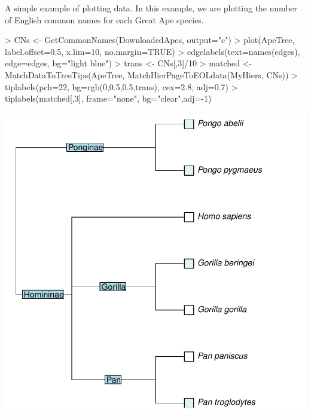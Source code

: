 \documentclass[12pt]{article}
\begin{document}
A simple example of plotting data.  In this example, we are plotting the number of English common names for each Great Ape species.  
\begin {center}
\begin{Schunk}
\begin{Sinput}
> CNs <- GetCommonNames(DownloadedApes, output="c")
> plot(ApeTree, label.offset=0.5, x.lim=10, no.margin=TRUE)
> edgelabels(text=names(edges), edge=edges, bg="light blue")
> trans <- CNs[,3]/10
> matched <- MatchDataToTreeTips(ApeTree, MatchHierPageToEOLdata(MyHiers, CNs))
> tiplabels(pch=22, bg=rgb(0,0.5,0.5,trans), cex=2.8, adj=0.7)
> tiplabels(matched[,3], frame="none", bg="clear",adj=-1)
\end{Sinput}
\end{Schunk}
\includegraphics{ReolUserManual-017}
\end{center}
\end{document}
